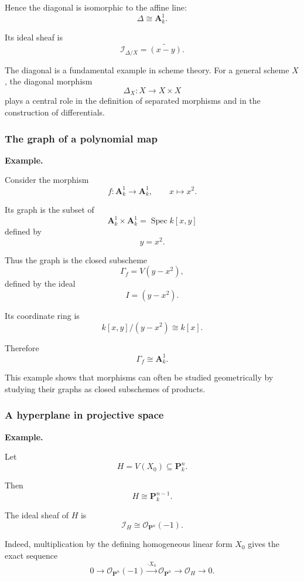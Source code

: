 Hence the diagonal is isomorphic to the affine line:
\[
\Delta\cong\mathbf A^1_k.
\]

Its ideal sheaf is
\[
\mathcal I_{\Delta/X}
=
\widetilde{(x-y)}.
\]

The diagonal is a fundamental example in scheme theory. For a general scheme \(X\), the diagonal morphism
\[
\Delta_X:X\longrightarrow X\times X
\]
plays a central role in the definition of separated morphisms and in the construction of differentials.

\subsubsection{The graph of a polynomial map}

\textbf{Example.}

Consider the morphism
\[
f:\mathbf A^1_k\longrightarrow\mathbf A^1_k,
\qquad
x\longmapsto x^2.
\]

Its graph is the subset of
\[
\mathbf A^1_k\times\mathbf A^1_k
=
\operatorname{Spec}k[x,y]
\]
defined by
\[
y=x^2.
\]

Thus the graph is the closed subscheme
\[
\Gamma_f=V(y-x^2),
\]
defined by the ideal
\[
I=(y-x^2).
\]

Its coordinate ring is
\[
k[x,y]/(y-x^2)\cong k[x].
\]

Therefore
\[
\Gamma_f\cong\mathbf A^1_k.
\]

This example shows that morphisms can often be studied geometrically by studying their graphs as closed subschemes of products.

\subsubsection{A hyperplane in projective space}

\textbf{Example.}

Let
\[
H=V(X_0)\subseteq\mathbf P^n_k.
\]

Then
\[
H\cong\mathbf P^{n-1}_k.
\]

The ideal sheaf of \(H\) is
\[
\mathcal I_H\cong\mathcal O_{\mathbf P^n}(-1).
\]

Indeed, multiplication by the defining homogeneous linear form \(X_0\) gives the exact sequence
\[
0
\longrightarrow
\mathcal O_{\mathbf P^n}(-1)
\xrightarrow{\cdot X_0}
\mathcal O_{\mathbf P^n}
\longrightarrow
\mathcal O_H
\longrightarrow
0.
\]

